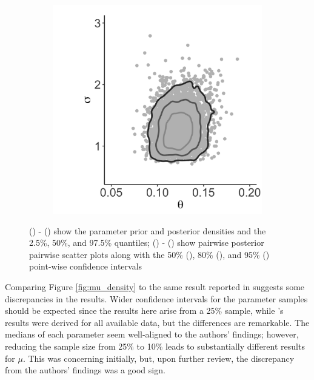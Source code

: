\documentclass{uwstat572}
\newcommand{\greyline}{\raisebox{2pt}{\tikz{\draw[-,gray,solid,line width = 1.5pt](0,0) -- (8mm,0);}}}
\newcommand{\darkgreyline}{\raisebox{2pt}{\tikz{\draw[-,darkgray,solid,line width = 1.5pt](0,0) -- (8mm,0);}}}
\newcommand{\blackline}{\raisebox{2pt}{\tikz{\draw[-,black,solid,line width = 1.5pt](0,0) -- (8mm,0);}}}
\begin{document}
\begin{figure}[t!]
\begin{subfigure}[b]{0.3\textwidth}
		\caption{}
		\label{fig:muTheta}
	\end{subfigure}
	\hfill
	\begin{subfigure}[b]{0.3\textwidth}
		\includegraphics[width=\textwidth]{figures/figure_2f.png}
		\caption{}
		\label{fig:sigmaTheta}
	\end{subfigure} 
	\caption{() - () show the parameter prior and posterior densities and the 2.5\%, 50\%, and 97.5\% quantiles;  () - () show pairwise posterior pairwise scatter plots along with the 50\% (\protect\greyline), 80\% (\protect\darkgreyline), and 95\% (\protect\blackline) point-wise confidence intervals}
	\label{fig:muSigmaThetaDensities}
\end{figure} 

Comparing Figure \ref{fig:mu_density} to the same result reported in \citep{Brown} suggests some discrepancies in the results. 
Wider confidence intervals for the parameter samples should be expected since the results here arise from a 25\% sample, while \cite{Brown}'s results were derived for all available data, but the differences are remarkable. 
The medians of each parameter seem well-aligned to the authors' findings; however, reducing the sample size from 25\% to 10\% leads to substantially different results for $\mu$. 
This was concerning initially, but, upon further review, the discrepancy from the authors' findings was a good sign. 
\end{document}
